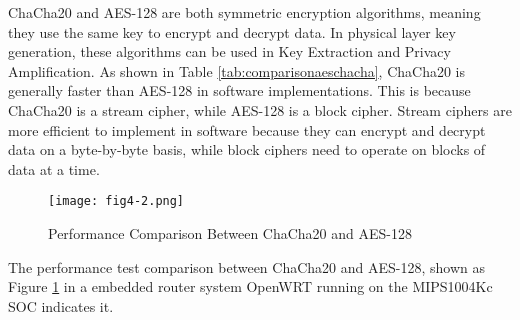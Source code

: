 ChaCha20 and AES-128 are both symmetric encryption algorithms, meaning they use the same key to encrypt and decrypt data. In physical layer key generation, these algorithms can be used in Key Extraction and Privacy Amplification. As shown in Table \ref{tab:comparisonaeschacha}, ChaCha20 is generally faster than AES-128 in software implementations. This is because ChaCha20 is a stream cipher, while AES-128 is a block cipher. Stream ciphers are more efficient to implement in software because they can encrypt and decrypt data on a byte-by-byte basis, while block ciphers need to operate on blocks of data at a time.
\begin{figure}
    \centering
    \texttt{[image: fig4-2.png]}
    \caption{Performance Comparison Between ChaCha20 and AES-128}
    \label{fig:4-2}
\end{figure}
The performance test comparison between ChaCha20 and AES-128, shown as Figure \ref{fig:4-2} in a embedded router system OpenWRT running on the MIPS1004Kc SOC indicates it.